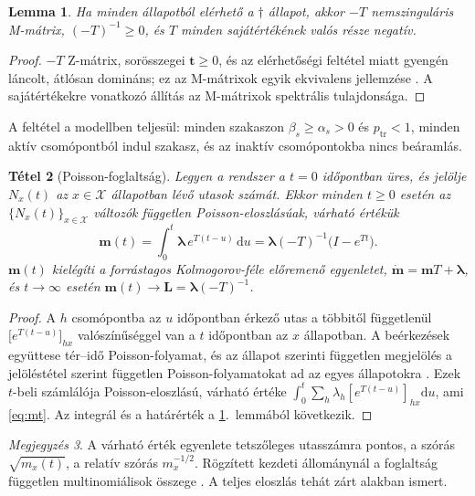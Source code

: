\documentclass[12pt,a4paper]{article}
\newtheorem{tetel}{Tétel}[section]
\newtheorem{lemma}[tetel]{Lemma}
\theoremstyle{definition}
\theoremstyle{remark}
\newtheorem{megjegyzes}[tetel]{Megjegyzés}
\newcommand{\Xs}{\mathcal{X}}
\begin{document}
\begin{lemma}
\label{lem:mmatrix}
Ha minden állapotból elérhető a $\dagger$ állapot, akkor $-T$ nemszinguláris
M-mátrix, $(-T)^{-1}\ge0$, és $T$ minden sajátértékének valós része negatív.
\end{lemma}

\begin{proof}
$-T$ Z-mátrix, sorösszegei $\bm t\ge0$, és az elérhetőségi feltétel miatt
gyengén láncolt, átlósan domináns; ez az M-mátrixok egyik ekvivalens
jellemzése \citep{berman1994}. A sajátértékekre vonatkozó állítás az
M-mátrixok spektrális tulajdonsága.
\end{proof}

A feltétel a modellben teljesül: minden szakaszon $\beta_s\ge\alpha_s>0$ és
$p_{\mathrm{tr}}<1$, minden aktív csomópontból indul szakasz, és az inaktív
csomópontokba nincs beáramlás.

\begin{tetel}[Poisson-foglaltság]
\label{tet:poisson}
Legyen a rendszer a $t=0$ időpontban üres, és jelölje $N_x(t)$ az
$x\in\Xs$ állapotban lévő utasok számát. Ekkor minden $t\ge0$ esetén az
$\{N_x(t)\}_{x\in\Xs}$ változók független Poisson-eloszlásúak, várható
értékük
\begin{equation}
  \bm m(t)=\int_0^t\bm\lambda\,e^{T(t-u)}\,\mathrm du
  =\bm\lambda(-T)^{-1}\bigl(I-e^{Tt}\bigr).
  \label{eq:mt}
\end{equation}
$\bm m(t)$ kielégíti a forrástagos Kolmogorov-féle előremenő egyenletet,
$\dot{\bm m}=\bm mT+\bm\lambda$, és $t\to\infty$ esetén
$\bm m(t)\to\bm L=\bm\lambda(-T)^{-1}$.
\end{tetel}

\begin{proof}
A $h$ csomópontba az $u$ időpontban érkező utas a többitől függetlenül
$\bigl[e^{T(t-u)}\bigr]_{hx}$ valószínűséggel van a $t$ időpontban az $x$
állapotban. A beérkezések együttese tér--idő Poisson-folyamat, és az
állapot szerinti független megjelölés a jelöléstétel szerint független
Poisson-folyamatokat ad az egyes állapotokra \citep{kingman1993}. Ezek
$t$-beli számlálója Poisson-eloszlású, várható értéke
$\int_0^t\sum_h\lambda_h[e^{T(t-u)}]_{hx}\mathrm du$, ami \eqref{eq:mt}. Az
integrál és a határérték a \ref{lem:mmatrix}.~lemmából következik.
\end{proof}

\begin{megjegyzes}
A várható érték egyenlete tetszőleges utasszámra pontos, a szórás
$\sqrt{m_x(t)}$, a relatív szórás $m_x^{-1/2}$. Rögzített kezdeti
állománynál a foglaltság független multinomiálisok összege
\citep{jahnke2007}. A teljes eloszlás tehát zárt alakban ismert.
\end{megjegyzes}
\end{document}
